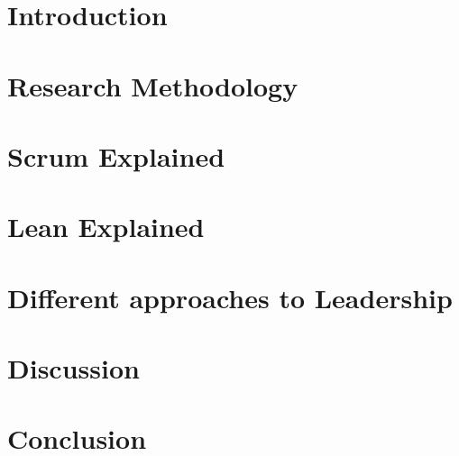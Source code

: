 



\frontmatter 

\cleardoublepage

\cleardoublepage

\cleardoublepage


\mainmatter



\chapter{Introduction}
\label{chap:intro}


\chapter{Research Methodology}
\label{chap:researchMethodology}


\chapter{Scrum Explained}
\label{chap:ScrumExplained}


\chapter{Lean Explained}
\label{chap:LeanExplained}


\chapter{Different approaches to Leadership}
\label{chap:LeadershipDifferences}


\chapter{Discussion}
\label{chap:Discussion}


\chapter{Conclusion}
\label{chap:conclusion}


